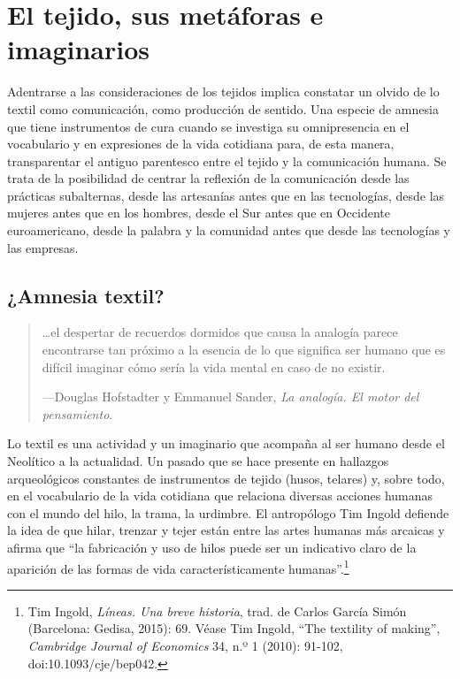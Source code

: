 \documentclass{tufte-handout}
\begin{document}
\hypertarget{el-tejido-sus-metforas-e-imaginarios}{%
\section{El tejido, sus metáforas e
imaginarios}\label{el-tejido-sus-metforas-e-imaginarios}}

Adentrarse a las consideraciones de los tejidos implica constatar un
olvido de lo textil como comunicación, como producción de sentido. Una
especie de amnesia que tiene instrumentos de cura cuando se investiga su
omnipresencia en el vocabulario y en expresiones de la vida cotidiana
para, de esta manera, transparentar el antiguo parentesco entre el
tejido y la comunicación humana. Se trata de la posibilidad de centrar
la reflexión de la comunicación desde las prácticas subalternas, desde
las artesanías antes que en las tecnologías, desde las mujeres antes que
en los hombres, desde el Sur antes que en Occidente euroamericano, desde
la palabra y la comunidad antes que desde las tecnologías y las
empresas.

\hypertarget{amnesia-textil}{%
\subsection{¿Amnesia
textil?}\label{amnesia-textil}}

\begin{quote}
\ldots el despertar de recuerdos dormidos que causa la analogía parece
encontrarse tan próximo a la esencia de lo que significa ser humano que
es difícil imaginar cómo sería la vida mental en caso de no existir.

---Douglas Hofstadter y Emmanuel Sander, \emph{La analogía. El motor del
pensamiento}.
\end{quote}

Lo textil es una actividad y un imaginario que acompaña al ser humano
desde el Neolítico a la actualidad. Un pasado que se hace presente en
hallazgos arqueológicos constantes de instrumentos de tejido (husos,
telares) y, sobre todo, en el vocabulario de la vida cotidiana que
relaciona diversas acciones humanas con el mundo del hilo, la trama, la
urdimbre. El antropólogo Tim Ingold defiende la idea de que hilar,
trenzar y tejer están entre las artes humanas más arcaicas y afirma que
``la fabricación y uso de hilos puede ser un indicativo claro de la
aparición de las formas de vida característicamente
humanas''.\footnote{Tim Ingold, \emph{Líneas. Una breve historia}, trad.
  de Carlos García Simón (Barcelona: Gedisa, 2015): 69. Véase Tim
  Ingold, ``The textility of making'', \emph{Cambridge Journal of
  Economics} 34, n.º 1 (2010): 91-102, doi:10.1093/cje/bep042.}
\end{document}
